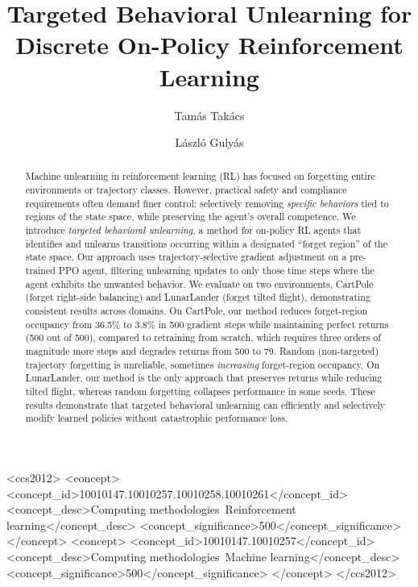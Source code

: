 \documentclass[sigconf]{acmart}
\begin{document}
\title{Targeted Behavioral Unlearning for Discrete On-Policy Reinforcement Learning}

\author{Tam\'as Tak\'acs}

\author{L\'aszl\'o Guly\'as}
\authornotemark[1]

\renewcommand{\shortauthors}{Tak\'acs and Guly\'as}

\begin{abstract}
Machine unlearning in reinforcement learning (RL) has focused on forgetting entire environments or trajectory classes. However, practical safety and compliance requirements often demand finer control: selectively removing \emph{specific behaviors} tied to regions of the state space, while preserving the agent's overall competence. We introduce \emph{targeted behavioral unlearning}, a method for on-policy RL agents that identifies and unlearns transitions occurring within a designated ``forget region'' of the state space. Our approach uses trajectory-selective gradient adjustment on a pre-trained PPO agent, filtering unlearning updates to only those time steps where the agent exhibits the unwanted behavior. We evaluate on two environments, CartPole (forget right-side balancing) and LunarLander (forget tilted flight), demonstrating consistent results across domains. On CartPole, our method reduces forget-region occupancy from 36.5\% to 3.8\% in 500 gradient steps while maintaining perfect returns (500 out of 500), compared to retraining from scratch, which requires three orders of magnitude more steps and degrades returns from 500 to 79. Random (non-targeted) trajectory forgetting is unreliable, sometimes \emph{increasing} forget-region occupancy. On LunarLander, our method is the only approach that preserves returns while reducing tilted flight, whereas random forgetting collapses performance in some seeds. These results demonstrate that targeted behavioral unlearning can efficiently and selectively modify learned policies without catastrophic performance loss.
\end{abstract}

\begin{CCSXML}
<ccs2012>
   <concept>
       <concept_id>10010147.10010257.10010258.10010261</concept_id>
       <concept_desc>Computing methodologies~Reinforcement learning</concept_desc>
       <concept_significance>500</concept_significance>
   </concept>
   <concept>
       <concept_id>10010147.10010257</concept_id>
       <concept_desc>Computing methodologies~Machine learning</concept_desc>
       <concept_significance>500</concept_significance>
   </concept>
</ccs2012>
\end{CCSXML}
\end{document}
